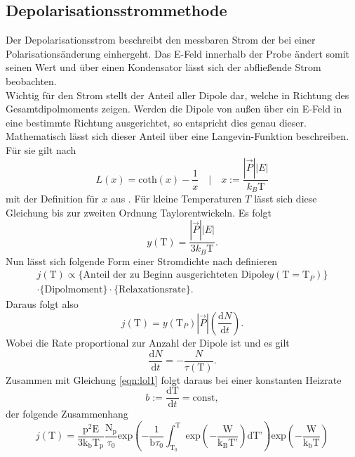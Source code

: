 \subsection{Depolarisationsstrommethode}
\label{sec:strom}
Der Depolarisationsstrom beschreibt den messbaren Strom der bei einer Polarisationsänderung einhergeht. Das E-Feld innerhalb der Probe ändert somit seinen Wert und über einen Kondensator lässt sich der abfließende Strom beobachten.
\\
Wichtig für den Strom stellt der Anteil aller Dipole dar, welche in Richtung des Gesamtdipolmoments zeigen. Werden die Dipole von außen über ein E-Feld in eine bestimmte Richtung ausgerichtet, so entspricht dies genau
dieser. Mathematisch lässt sich dieser Anteil über eine Langevin-Funktion beschreiben. Für sie gilt nach \cite{KROGER201577}
\begin{equation}
L(x) = \text{coth}(x) - \frac{1}{x} \quad \Biggl| \quad x := \frac{|\vec{P}||E|}{k_{B} \text{T}}
\end{equation}
mit der Definition für $x$ aus \cite{altskript}. Für kleine Temperaturen $T$ lässt sich diese Gleichung bis zur zweiten Ordnung Taylorentwickeln.
Es folgt
\begin{equation}
y(\text{T}) = \frac{|\vec{P}||E|}{3k_{B} \text{T}}.
\end{equation}
Nun lässt sich folgende Form einer Stromdichte nach \cite{Fuller} definieren
\begin{multline}
j(\text{T}) \propto \{\text{Anteil der zu Beginn ausgerichteten Dipole} y(\text{T} = \text{T}_P)\} \\ \cdot \{\text{Dipolmoment}\} \cdot \{\text{Relaxationsrate}\}.
\end{multline}
Daraus folgt also
\begin{equation}
j(\text{T}) = y(\text{T}_P) |\vec{P}| \left(\frac{\text{d}N}{\text{d}t}\right).
\end{equation}
Wobei die Rate proportional zur Anzahl der Dipole ist und es gilt
\begin{equation}
    \frac{\text{d}N}{\text{d}t} = - \frac{N}{\tau(\text{T})}.
\end{equation}
Zusammen mit Gleichung \eqref{eqn:lol1} folgt daraus bei einer konstanten Heizrate 
\begin{equation}
b := \frac{\text{dT}}{\text{d}t} = \text{const},
\end{equation}
der folgende Zusammenhang
\begin{equation}
    j \left( \text{T} \right) = \frac{\text{p}^2 \text{E}}{3\text{k}_{\text{b}}\text{T}_{\text{p}}} \frac{\text{N}_{\text{p}}}{\tau_0} \text{exp} \left( -\frac{1}{\text{b}\tau_0} \int^{\text{T}}_{\text{T}_0}  \text{exp} \left( - \frac{\text{W}}{\text{k}_{\text{B}}\text{T'}} \right) \text{dT'} \right) \text{exp} \left(-\frac{\text{W}}{\text{k}_{\text{b}}\text{T}} \right)
    \label{killme}
\end{equation}
